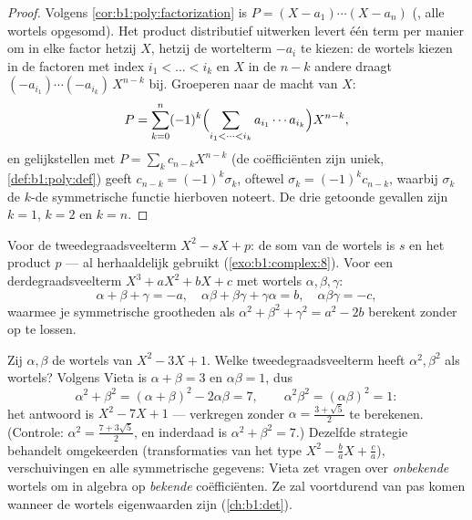 \begin{proof}
Volgens \cref{cor:b1:poly:factorization} is $P = (X - a_1)\cdots(X -
a_n)$ (, alle wortels opgesomd). Het product distributief
uitwerken levert één term per manier om in elke factor hetzij $X$, hetzij
de wortelterm $-a_i$ te kiezen: de wortels kiezen in de factoren met
index $i_1 < \dots < i_k$ en $X$ in de $n - k$ andere draagt
$(-a_{i_1})\cdots(-a_{i_k})\,X^{n-k}$ bij. Groeperen naar de macht van
$X$:
\[
P = \sum_{k=0}^{n} (-1)^k
\Bigl(\sum_{i_1 < \dots < i_k} a_{i_1}\cdots a_{i_k}\Bigr)
X^{n-k} ,
\]
en gelijkstellen met $P = \sum_k c_{n-k}X^{n-k}$ (de coëfficiënten zijn
uniek, \cref{def:b1:poly:def}) geeft $c_{n-k} = (-1)^k \sigma_k$, oftewel
$\sigma_k = (-1)^kc_{n-k}$, waarbij $\sigma_k$ de $k$-de symmetrische
functie hierboven noteert. De drie getoonde gevallen zijn $k = 1$, $k =
2$ en $k = n$.
\end{proof}

\begin{example}\label{ex:b1:poly:vieta}
Voor de tweedegraadsveelterm $X^2 - sX + p$: de som van de wortels is $s$
en het product $p$ --- al herhaaldelijk gebruikt
(\cref{exo:b1:complex:8}). Voor een  derdegraadsveelterm $X^3 +
aX^2 + bX + c$ met wortels $\alpha, \beta, \gamma$:
\[
\alpha + \beta + \gamma = -a,
\quad
\alpha\beta + \beta\gamma + \gamma\alpha = b,
\quad
\alpha\beta\gamma = -c ,
\]
waarmee je symmetrische grootheden als $\alpha^2 + \beta^2 + \gamma^2 =
a^2 - 2b$ berekent zonder op te lossen.
\end{example}

\begin{example}\label{ex:b1:poly:transformroots}
Zij $\alpha, \beta$ de wortels van $X^2 - 3X + 1$. Welke 
tweedegraadsveelterm heeft $\alpha^2, \beta^2$ als wortels? Volgens Vieta
is $\alpha + \beta = 3$ en $\alpha\beta = 1$, dus
\[
\alpha^2 + \beta^2 = (\alpha+\beta)^2 - 2\alpha\beta = 7,
\qquad
\alpha^2\beta^2 = (\alpha\beta)^2 = 1 :
\]
het antwoord is $X^2 - 7X + 1$ --- verkregen zonder $\alpha = \frac{3 +
\sqrt5}2$ te berekenen. (Controle: $\alpha^2 = \frac{7 + 3\sqrt5}2$, en
inderdaad is $\alpha^2 + \beta^2 = 7$.) Dezelfde strategie behandelt
omgekeerden (transformaties van het type $X^2 - \frac ba X + \frac ca$),
verschuivingen en alle symmetrische gegevens: Vieta zet vragen over
\emph{onbekende} wortels om in algebra op \emph{bekende} coëfficiënten.
Ze zal voortdurend van pas komen wanneer de wortels eigenwaarden zijn
(\cref{ch:b1:det}).
\end{example}

